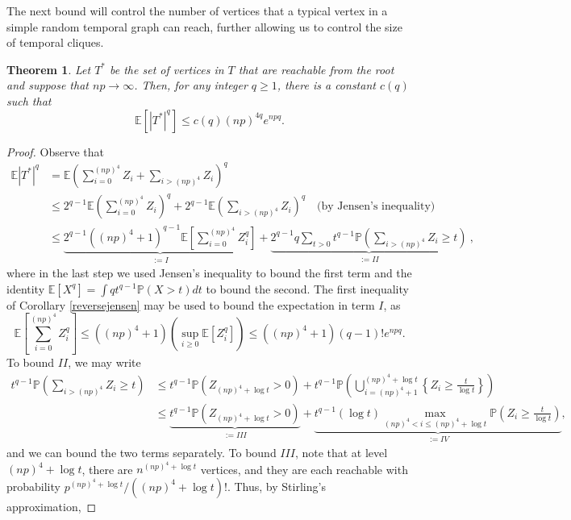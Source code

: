 \documentclass[11pt]{article}
\newtheorem{theorem}{Theorem}[]
\newcommand{\1}{\mathbf{1}} %
\newcommand{\prob}{\mathbb{P}} %
\newcommand{\ex}{\mathbb{E}} %
\begin{document}
The next bound will control the number of vertices that a typical vertex in a simple random temporal graph can reach, further allowing us to control the size of temporal cliques.

\begin{theorem}\label{sizebound} Let $T^*$ be the set of vertices in $T$ that are reachable from the root and suppose that $np \to \infty$. Then, for any integer $q \geq 1$, there is a constant $c(q)$ such that
$$\ex[|T^*|^q] \leq c(q)(np)^{4q}e^{npq}.$$
\end{theorem}


\begin{proof}
Observe that
\begin{align*}
    \ex|T^*|^q & = \ex\left(\sum_{i=0}^{(np)^4}Z_i + \sum_{i > (np)^4} Z_i\right)^q  \\
& \le 2^{q-1} \ex\left(\sum_{i=0}^{(np)^4}Z_i \right)^q + 2^{q-1} \ex\left(\sum_{i > (np)^4} Z_i\right)^q
\quad \text{(by Jensen's inequality)} \\
&
\leq \underbrace{2^{q-1}((np)^4+1)^{q-1}\ex\left[ \sum_{i=0}^{(np)^4} Z_i^q \right]}_{:= I} + \underbrace{2^{q-1}q\sum_{t > 0}t^{q-1}\prob\left(\sum_{i > (np)^4} Z_i \geq t\right)}_{:= II}~,
\end{align*}
where in the last step we used Jensen's inequality to bound the first term and 
the identity $\ex[X^q] = \int qt^{q-1}\prob(X > t) dt$ to bound the second.
The first inequality of Corollary \ref{reversejensen} may be used to bound 
the expectation in term $I$,
 as 
$$\ex\left[ \sum_{i=0}^{(np)^4} Z_i^q\right] \leq 
((np)^{4}+1)
\left(\sup_{i \geq 0}\ex[Z_i^q]\right) \leq
((np)^{4}+1)
(q - 1)!e^{npq}.$$
To bound $II$, we may write
\begin{align*}
t^{q-1}\prob\left( \sum_{i > (np)^4} Z_i \geq t\right) &\leq t^{q-1}\prob\left( Z_{(np)^4 + \log t} > 0\right) + t^{q-1}\prob\left(\bigcup_{i=(np)^4 + 1}^{(np)^4 + \log t} \left\{Z_i \geq \frac{t}{\log t}\right\}\right) \\
&\leq \underbrace{t^{q-1}\prob\left( Z_{(np)^4 + \log t} > 0\right)}_{:=III} + \underbrace{t^{q-1}(\log t)\max_{(np)^4 < i \leq (np)^4 + \log t} \prob\left(Z_i \geq \frac{t}{\log t}\right)}_{:= IV},
\end{align*}
and we can bound the two terms separately. To bound $III$, note that at level $(np)^4+\log t$, there are $n^{(np)^4 + \log t}$ vertices, and they are each reachable with probability $p^{(np)^4 + \log t}/((np)^4+ \log t)!$. Thus, by Stirling's approximation,

\end{proof}
\end{document}
